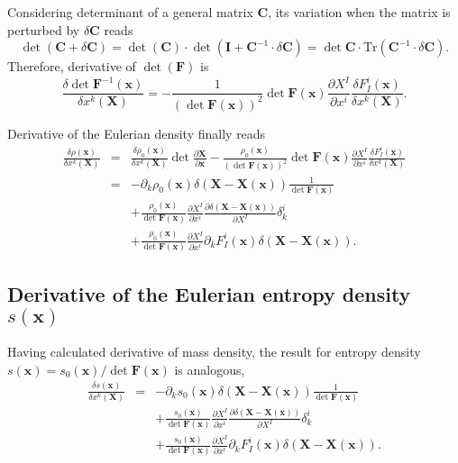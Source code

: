 \documentclass[
10pt, %
a4paper, %
oneside, %
headinclude,footinclude, %
BCOR5mm, %
]{scrartcl}
\newcommand{\xx}{\mathbf{x}}
\newcommand{\XX}{\mathbf{X}}
\newcommand{\Id}{\mathbf{I}}
\newcommand{\Tr}{\mathrm{Tr}}
\newcommand{\CC}{\mathbf{C}}
\newcommand{\FF}{\mathbf{F}}
\begin{document}
Considering determinant of a general matrix $\CC$, its variation when the matrix is perturbed by $\delta\CC$ reads
\begin{equation}
	\det(\CC+\delta\CC) = \det(\CC)\cdot\det(\Id+\CC^{-1}\cdot\delta\CC) = \det\CC\cdot\Tr(\CC^{-1}\cdot\delta\CC).
\end{equation}
Therefore, derivative of $\det(\FF)$ is
\begin{equation}
	\frac{\delta \det \FF^{-1}(\xx)}{\delta x^k(\XX)}
	= -\frac{1}{(\det \FF(\xx))^2} \det \FF(\xx) \frac{\partial X^I}{\partial x^i} \frac{\delta F^i_I(\xx)}{\delta x^k(\XX)}.
\end{equation}

Derivative of the Eulerian density finally reads
\begin{eqnarray}
	\frac{\delta \rho(\xx)}{\delta x^k(\XX)}&=&\frac{\delta \rho_0(\xx)}{\delta x^k(\XX)} \det \frac{\partial \XX}{\partial \xx}
	-\frac{\rho_0(\xx)}{(\det \FF(\xx))^2} \det \FF(\xx) \frac{\partial X^I}{\partial x^i} \frac{\delta F^i_I(\xx)}{\delta x^k(\XX)}\nonumber\\
	&=&-\partial_k \rho_0(\xx) \delta(\XX-\XX(\xx))\frac{1}{\det\FF(\xx)}\nonumber\\
	&&
	+\frac{\rho_0(\xx)}{\det \FF(\xx)} \frac{\partial X^I}{\partial x^i} \frac{\partial \delta(\XX-\XX(\xx))}{\partial X^I}\delta^i_k \nonumber\\
	&&+\frac{\rho_0(\xx)}{\det \FF(\xx)} \frac{\partial X^I}{\partial x^i} \partial_k F^i_I(\xx)\delta(\XX-\XX(\xx)).
\end{eqnarray}

\subsection{Derivative of the Eulerian entropy density $s(\xx)$}
Having calculated derivative of mass density, the result for entropy density $s(\xx)=s_0(\xx)/\det\FF(\xx)$  is analogous,
\begin{eqnarray}
	\frac{\delta s(\xx)}{\delta x^k(\XX)}&=&
	-\partial_k s_0(\xx) \delta(\XX-\XX(\xx))\frac{1}{\det\FF(\xx)}\nonumber\\
	&&
	+\frac{s_0(\xx)}{\det \FF(\xx)} \frac{\partial X^I}{\partial x^i} \frac{\partial \delta(\XX-\XX(\xx))}{\partial X^I}\delta^i_k \nonumber\\
	&&+\frac{s_0(\xx)}{\det \FF(\xx)} \frac{\partial X^I}{\partial x^i} \partial_k F^i_I(\xx)\delta(\XX-\XX(\xx)).
\end{eqnarray}
\end{document}
